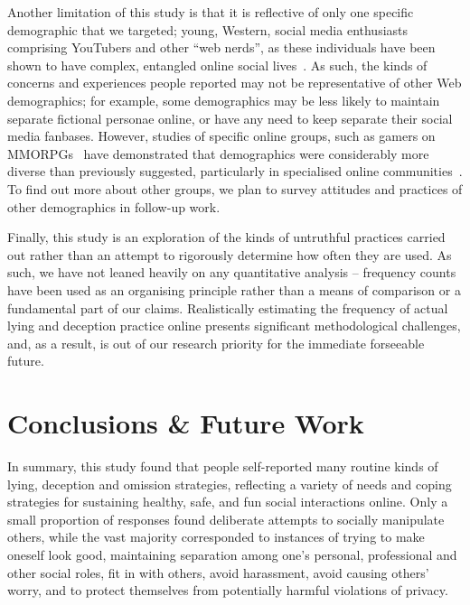 \documentclass{sig-alternate}
\newcommand{\todo}[1]{\textbf{\color{red}TODO: #1}}
\begin{document}
Another limitation of this study is that it is reflective of only one specific demographic that we targeted; young, Western, social media enthusiasts comprising YouTubers and other ``web nerds'', as these individuals have been shown to have complex, entangled online social lives~\cite{boyd2014s,livingstone2008taking,lenhart2008teens, lenhart2010social, madden2013teens}.  As such,  the kinds of concerns and experiences people reported may not be representative of other Web demographics; for example, some demographics may be less likely to maintain separate fictional personae online, or have any need to keep separate their social media fanbases. However, studies of specific online groups, such as gamers on MMORPGs~\cite{yee2006demographics} have demonstrated that demographics were considerably more diverse than previously suggested, particularly in specialised online communities~\cite{chan2011virtual}. To find out more about other groups, we plan to survey attitudes and practices of other demographics in follow-up work.

Finally, this study is an exploration of the kinds of untruthful practices carried out rather than an attempt to rigorously determine how often they are used. As such, we have not leaned heavily on any quantitative analysis -- frequency counts have been used as an organising principle rather than a means of comparison or a fundamental part of our claims.  Realistically estimating the frequency of actual lying and deception practice online presents significant methodological challenges, and, as a result, is out of our research priority for the immediate forseeable future.  


\section{Conclusions \& Future Work}

In summary, this study found that people self-reported many routine kinds of lying, deception and omission strategies, reflecting a variety of needs and coping strategies for sustaining healthy, safe, and fun social interactions online.  Only a small proportion of responses found deliberate attempts to socially manipulate others, while the vast majority corresponded to instances of trying to make oneself look good, maintaining separation among one's personal, professional and other social roles, fit in with others, avoid harassment, avoid causing others' worry, and to protect themselves from potentially harmful violations of privacy. 
\end{document}
